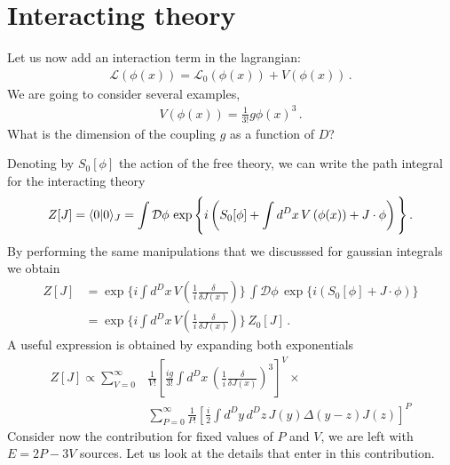 \section{Interacting theory}
\label{sec:interacting-theory}

Let us now add an interaction term in the lagrangian:
\begin{align}
  \mathcal{L}\left(\phi(x)\right) = 
  \mathcal{L}_0\left(\phi(x)\right) + V\left(\phi(x)\right)\, .
\end{align}
We are going to consider several examples, \eg
\begin{align}
  V\left(\phi(x)\right) = \frac{1}{3!} g \phi(x)^3\, .
\end{align}
What is the dimension of the coupling $g$ as a function of $D$?

Denoting by $S_0[\phi]$ the action of the free theory, we can write
the path integral for the interacting theory
\begin{align}
  Z[J] = \langle 0 | 0 \rangle_J = \int \mathcal{D}\phi\, 
  \exp\Bigg\{i \left( S_0[\phi] + \int d^Dx\,  V\left(\phi(x)\right) 
  + J \cdot \phi \right) \Bigg\}\, .
\end{align}
By performing the same manipulations that we discusssed for 
gaussian integrals we obtain
\begin{align}
  Z[J] &= \exp \Bigg\{i \int d^Dx\,  
         V\left(\frac{1}{i}\frac{\delta}{\delta J(x)}\right) \Bigg\}\, 
         \int \mathcal{D}\phi\, 
         \exp\Bigg\{i \left( S_0[\phi]  
         + J \cdot \phi \right) \Bigg\} \\
       &= \exp \Bigg\{i \int d^Dx\,  
         V\left(\frac{1}{i}\frac{\delta}{\delta J(x)}\right) \Bigg\}\, 
         Z_0[J]\, .
\end{align}
A useful expression is obtained by expanding both exponentials
\begin{align}
  Z[J] \propto 
  \sum_{V=0}^\infty & \frac{1}{V!} \left[
                      \frac{i g}{3!} \int d^Dx\, 
                      \left(\frac{1}{i}\frac{\delta}{\delta J(x)}\right)^3
                      \right]^V \times \\
  \label{eq:DoubleExpExp}
                    & \sum_{P=0}^\infty \frac{1}{P!} \left[
                      \frac{i}{2} \int d^Dy\, d^Dz\, 
                      J(y) \Delta(y-z) J(z)
                      \right]^P
\end{align}
Consider now the contribution for fixed values of $P$ and $V$, we are
left with $E=2P-3V$ sources. Let us look at the details that enter in
this contribution. 
